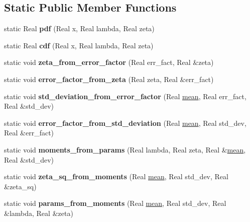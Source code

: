 \subsection*{Static Public Member Functions}
\begin{DoxyCompactItemize}
\item 
static Real {\bfseries pdf} (Real x, Real lambda, Real zeta)\label{classPecos_1_1LognormalRandomVariable_a1d84a4e8006cb3c70d737f7738d31824}

\item 
static Real {\bfseries cdf} (Real x, Real lambda, Real zeta)\label{classPecos_1_1LognormalRandomVariable_a31cde087e0c30b3217524c890973eac3}

\item 
static void {\bfseries zeta\+\_\+from\+\_\+error\+\_\+factor} (Real err\+\_\+fact, Real \&zeta)\label{classPecos_1_1LognormalRandomVariable_affca6e2b62db4846f9327a0dac1d7605}

\item 
static void {\bfseries error\+\_\+factor\+\_\+from\+\_\+zeta} (Real zeta, Real \&err\+\_\+fact)\label{classPecos_1_1LognormalRandomVariable_a2b0194f98bf0322210b6743e5376c2f9}

\item 
static void {\bfseries std\+\_\+deviation\+\_\+from\+\_\+error\+\_\+factor} (Real \hyperlink{classPecos_1_1LognormalRandomVariable_a962ffe5a3593be370d5c883365c060f4}{mean}, Real err\+\_\+fact, Real \&std\+\_\+dev)\label{classPecos_1_1LognormalRandomVariable_adf4688894a208bc0bdc2b69fe3da9a4b}

\item 
static void {\bfseries error\+\_\+factor\+\_\+from\+\_\+std\+\_\+deviation} (Real \hyperlink{classPecos_1_1LognormalRandomVariable_a962ffe5a3593be370d5c883365c060f4}{mean}, Real std\+\_\+dev, Real \&err\+\_\+fact)\label{classPecos_1_1LognormalRandomVariable_a69741ef2cd4a868094313bca4a6f11fa}

\item 
static void {\bfseries moments\+\_\+from\+\_\+params} (Real lambda, Real zeta, Real \&\hyperlink{classPecos_1_1LognormalRandomVariable_a962ffe5a3593be370d5c883365c060f4}{mean}, Real \&std\+\_\+dev)\label{classPecos_1_1LognormalRandomVariable_af64ca09c64d690373f0b2dda2dc36326}

\item 
static void {\bfseries zeta\+\_\+sq\+\_\+from\+\_\+moments} (Real \hyperlink{classPecos_1_1LognormalRandomVariable_a962ffe5a3593be370d5c883365c060f4}{mean}, Real std\+\_\+dev, Real \&zeta\+\_\+sq)\label{classPecos_1_1LognormalRandomVariable_a880724c18b1f5c7aa8ad321b219aabb8}

\item 
static void {\bfseries params\+\_\+from\+\_\+moments} (Real \hyperlink{classPecos_1_1LognormalRandomVariable_a962ffe5a3593be370d5c883365c060f4}{mean}, Real std\+\_\+dev, Real \&lambda, Real \&zeta)\label{classPecos_1_1LognormalRandomVariable_a9554a4692a4475ef049f918a1ebcb17f}

\end{DoxyCompactItemize}
